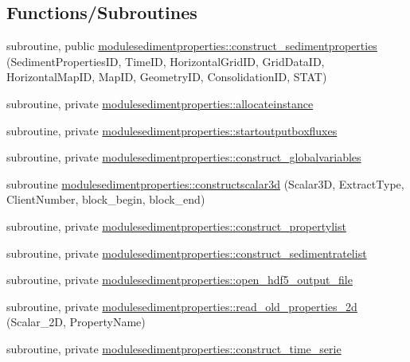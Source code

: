\subsection*{Functions/\+Subroutines}
\begin{DoxyCompactItemize}
\item 
subroutine, public \mbox{\hyperlink{namespacemodulesedimentproperties_a73be9d7faf93dc6b2994d535213bbd58}{modulesedimentproperties\+::construct\+\_\+sedimentproperties}} (Sediment\+Properties\+ID, Time\+ID, Horizontal\+Grid\+ID, Grid\+Data\+ID, Horizontal\+Map\+ID, Map\+ID, Geometry\+ID, Consolidation\+ID, S\+T\+AT)
\item 
subroutine, private \mbox{\hyperlink{namespacemodulesedimentproperties_a0e2131732a53a8682cb31baa3a65d6ae}{modulesedimentproperties\+::allocateinstance}}
\item 
subroutine, private \mbox{\hyperlink{namespacemodulesedimentproperties_a003fd1b9c4a46c432214de1d337ed97a}{modulesedimentproperties\+::startoutputboxfluxes}}
\item 
subroutine, private \mbox{\hyperlink{namespacemodulesedimentproperties_ac04693b92d1ed98577124026a0fb1d2e}{modulesedimentproperties\+::construct\+\_\+globalvariables}}
\item 
subroutine \mbox{\hyperlink{namespacemodulesedimentproperties_a8f2d8b343c149475187c15596c0bde5e}{modulesedimentproperties\+::constructscalar3d}} (Scalar3D, Extract\+Type, Client\+Number, block\+\_\+begin, block\+\_\+end)
\item 
subroutine, private \mbox{\hyperlink{namespacemodulesedimentproperties_abc91092616fbf4edf02daa5a7b1fcbb9}{modulesedimentproperties\+::construct\+\_\+propertylist}}
\item 
subroutine, private \mbox{\hyperlink{namespacemodulesedimentproperties_ac8e0d26b714ef94bff3a38a7730ee2a5}{modulesedimentproperties\+::construct\+\_\+sedimentratelist}}
\item 
subroutine, private \mbox{\hyperlink{namespacemodulesedimentproperties_a53b69fba92a04f1c26ee8ee39794357d}{modulesedimentproperties\+::open\+\_\+hdf5\+\_\+output\+\_\+file}}
\item 
subroutine, private \mbox{\hyperlink{namespacemodulesedimentproperties_a4e8f3da0b8583fb335570e3c3f8a4bb0}{modulesedimentproperties\+::read\+\_\+old\+\_\+properties\+\_\+2d}} (Scalar\+\_\+2D, Property\+Name)
\item 
subroutine, private \mbox{\hyperlink{namespacemodulesedimentproperties_a96254e985001cdec16870dc8c0188366}{modulesedimentproperties\+::construct\+\_\+time\+\_\+serie}}

\end{DoxyCompactItemize}
